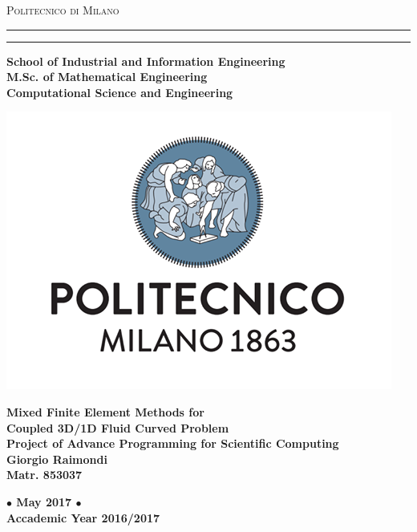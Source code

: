 \documentclass[a4paper]{report}
\begin{document}
     \begin{titlepage}
		\begin{center}
			{{\Large{\textsc{Politecnico di Milano}}}} \rule[0.1cm]{15.8cm}{0.1mm}
			\rule[0.5cm]{15.8cm}{0.6mm}
			{\small{\bf School of Industrial and Information Engineering\\
					M.Sc. of Mathematical Engineering\\
					Computational Science and Engineering}}
		\end{center}
		\begin{center}
			\includegraphics[scale=0.2]{poli}
		\end{center}
		\vspace{25mm}
		\begin{center}
			{\LARGE{\bf Mixed Finite Element Methods for }}\\
			\vspace{3mm}
			{\LARGE{\bf Coupled 3D/1D Fluid Curved Problem}}\\
			\vspace{25mm} {\large{\bf {Project of Advance Programming for Scientific Computing}}}\\
			\vspace{25mm} {\large{\bf {Giorgio Raimondi}}}\\
			\large{\bf Matr. 853037}\\
		\end{center}
		\vspace{30mm}
		\begin{center}
			{\large{\bf $\bullet$ May 2017 $\bullet$ \\
					Accademic Year 2016/2017 }}
		\end{center}
	\end{titlepage}
\end{document}
